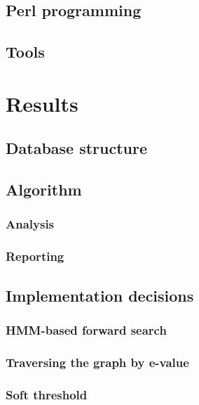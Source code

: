 \documentclass[a4paper,12pt]{scrreprt}
\begin{document}
	\section{Perl programming}
		
	\section{Tools}
		

\chapter{Results}
	
	\section{Database structure}
		
	\section{Algorithm}
		
		\subsection{Analysis}
			
		\subsection{Reporting}
			
	\section{Implementation decisions}
		\subsection{HMM-based forward search}
			
		\subsection{Traversing the graph by e-value}
			
		\subsection{Soft threshold}
			
\end{document}
